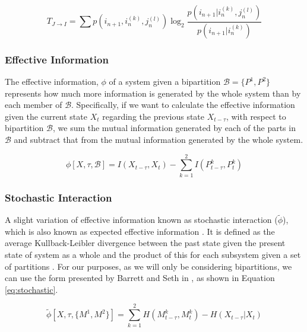 \documentclass[a4paper,11pt]{article}
\begin{document}
\begin{equation} \label{eq:te}
T_{J \rightarrow I} = \sum p(i_{n+1}, i_{n}^{(k)}, j_{n}^{(l)}) \log_2 \frac{p(i_{n+1} | i_{n}^{(k)}, j_{n}^{(l)})}{p(i_{n+1} | i_{n}^{(k)})}
\end{equation}

\subsubsection{Effective Information}
\label{EI}

The effective information, $\phi$ of a system given a bipartition $\mathcal{B} = \lbrace P^1, P^2 \rbrace$ represents how much more information is generated by the whole system than by each member of $\mathcal{B}$. Specifically, if we want to calculate the effective information given the current state $X_t$ regarding the previous state $X_{t - \tau}$, with respect to bipartition $\mathcal{B}$, we sum the mutual information generated by each of the parts in $\mathcal{B}$ and subtract that from the mutual information generated by the whole system.

\begin{equation} \label{eq:ei}
\phi [X, \tau, \mathcal{B}] = I(X_{t-\tau}, X_t) - \sum_{k=1}^{2} I(P_{t-\tau}^k, P_{t}^k)
\end{equation}

\subsubsection{Stochastic Interaction}
\label{sec:bg:stochastic}

A slight variation of effective information known as stochastic interaction ($\tilde{\phi}$), which is also known as expected effective information \cite{Barrett2011}. It is defined as the average Kullback-Leibler divergence between the past state given the present state of system as a whole and the product of this for each subsystem given a set of partitions \cite{Ay2015}. For our purposes, as we will only be considering bipartitions, we can use the form presented by Barrett and Seth in \cite{Barrett2011}, as shown in Equation \ref{eq:stochastic}.

\begin{equation} \label{eq:stochastic}
\tilde{\phi} [X, \tau, \{M^1, M^2\}] = \sum_{k=1}^{2} H(M_{t-\tau}^k, M_{t}^k)  - H(X_{t-\tau} | X_t)
\end{equation}
\end{document}
